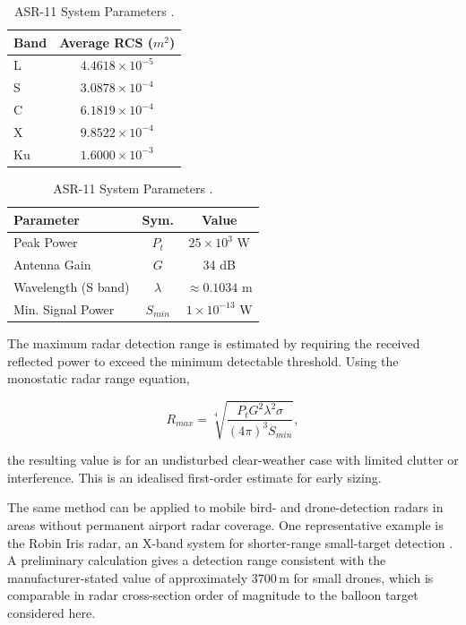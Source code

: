 \begin{table}[ht]
    \centering
    \begin{minipage}{0.45\textwidth}
        \centering
        \caption{Average RCS values of air balloon \cite{HUANG2024DetectionRadar.}.}
        \label{tab:rcs_values}
        \begin{tabular}{lc}
            \toprule
            Band & Average RCS ($m^2$) \\
            \midrule
            L  & $4.4618 \times 10^{-5}$ \\
            S  & $3.0878 \times 10^{-4}$ \\
            C  & $6.1819 \times 10^{-4}$ \\
            X  & $9.8522 \times 10^{-4}$ \\
            Ku & $1.6000 \times 10^{-3}$ \\
            \bottomrule
        \end{tabular}
    \end{minipage}
    \hfill
    \begin{minipage}{0.5\textwidth}
        \centering
        \caption{ASR-11 System Parameters \cite{ASR}.}
        \label{tab:asr11_parameters}
        \begin{tabular}{lcc}
            \toprule
            \textbf{Parameter} & \textbf{Sym.} & \textbf{Value} \\
            \midrule
            Peak Power & $P_t$ & $25 \times 10^3$ W \\
            Antenna Gain & $G$ & 34 dB \\
            Wavelength (S band) & $\lambda$ & $\approx 0.1034$ m \\
            Min. Signal Power & $S_{min}$ & $1 \times 10^{-13}$ W \\
            \bottomrule
        \end{tabular}
    \end{minipage}
\end{table}

The maximum radar detection range is estimated by requiring the received reflected power to exceed the minimum detectable threshold. Using the monostatic radar range equation,

\begin{equation}
    R_{max}=\sqrt[4]{\frac{P_tG^2\lambda^2\sigma}{(4\pi)^3S_{min}}},
\end{equation}

the resulting value is  for an undisturbed clear-weather case with limited clutter or interference. This is an idealised first-order estimate for early sizing.

The same method can be applied to mobile bird- and drone-detection radars in areas without permanent airport radar coverage. One representative example is the Robin Iris radar, an X-band system for shorter-range small-target detection \cite{BirdRadar}. A preliminary calculation gives a detection range consistent with the manufacturer-stated value of approximately $3700\,\text{m}$ for small drones, which is comparable in radar cross-section order of magnitude to the balloon target considered here.